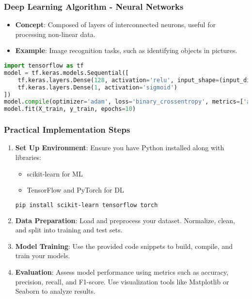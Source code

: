\documentclass[aspectratio=169]{beamer}
\begin{document}
\begin{frame}[fragile]
    \frametitle{Deep Learning Algorithm - Neural Networks}
    \begin{itemize}
        \item \textbf{Concept}: Composed of layers of interconnected neurons, useful for processing non-linear data.
        \item \textbf{Example}: Image recognition tasks, such as identifying objects in pictures.
    \end{itemize}
    \begin{lstlisting}[language=Python]
import tensorflow as tf
model = tf.keras.models.Sequential([
    tf.keras.layers.Dense(128, activation='relu', input_shape=(input_dim,)),
    tf.keras.layers.Dense(1, activation='sigmoid')
])
model.compile(optimizer='adam', loss='binary_crossentropy', metrics=['accuracy'])
model.fit(X_train, y_train, epochs=10)
    \end{lstlisting}
\end{frame}

\begin{frame}[fragile]
    \frametitle{Practical Implementation Steps}
    \begin{enumerate}
        \item \textbf{Set Up Environment}: Ensure you have Python installed along with libraries: 
        \begin{itemize}
            \item scikit-learn for ML
            \item TensorFlow and PyTorch for DL
        \end{itemize}
        \begin{lstlisting}[language=sh]
pip install scikit-learn tensorflow torch
        \end{lstlisting}

        \item \textbf{Data Preparation}: Load and preprocess your dataset. Normalize, clean, and split into training and test sets.
        
        \item \textbf{Model Training}: Use the provided code snippets to build, compile, and train your models.
        
        \item \textbf{Evaluation}: Assess model performance using metrics such as accuracy, precision, recall, and F1-score. Use visualization tools like Matplotlib or Seaborn to analyze results.
    \end{enumerate}
\end{frame}
\end{document}
